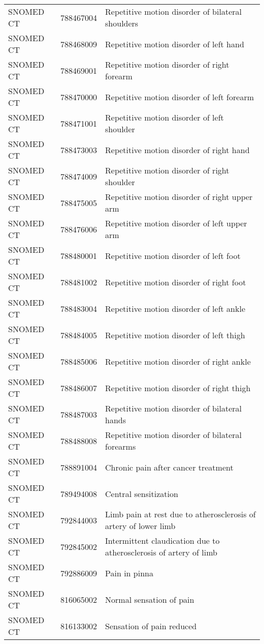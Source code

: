 \begin{longtable}{p{}p{}p{}}
  SNOMED CT & 788467004 & Repetitive motion disorder of bilateral shoulders \\ 
  SNOMED CT & 788468009 & Repetitive motion disorder of left hand \\ 
  SNOMED CT & 788469001 & Repetitive motion disorder of right forearm \\ 
  SNOMED CT & 788470000 & Repetitive motion disorder of left forearm \\ 
  SNOMED CT & 788471001 & Repetitive motion disorder of left shoulder \\ 
  SNOMED CT & 788473003 & Repetitive motion disorder of right hand \\ 
  SNOMED CT & 788474009 & Repetitive motion disorder of right shoulder \\ 
  SNOMED CT & 788475005 & Repetitive motion disorder of right upper arm \\ 
  SNOMED CT & 788476006 & Repetitive motion disorder of left upper arm \\ 
  SNOMED CT & 788480001 & Repetitive motion disorder of left foot \\ 
  SNOMED CT & 788481002 & Repetitive motion disorder of right foot \\ 
  SNOMED CT & 788483004 & Repetitive motion disorder of left ankle \\ 
  SNOMED CT & 788484005 & Repetitive motion disorder of left thigh \\ 
  SNOMED CT & 788485006 & Repetitive motion disorder of right ankle \\ 
  SNOMED CT & 788486007 & Repetitive motion disorder of right thigh \\ 
  SNOMED CT & 788487003 & Repetitive motion disorder of bilateral hands \\ 
  SNOMED CT & 788488008 & Repetitive motion disorder of bilateral forearms \\ 
  SNOMED CT & 788891004 & Chronic pain after cancer treatment \\ 
  SNOMED CT & 789494008 & Central sensitization \\ 
  SNOMED CT & 792844003 & Limb pain at rest due to atherosclerosis of artery of lower limb \\ 
  SNOMED CT & 792845002 & Intermittent claudication due to atherosclerosis of artery of limb \\ 
  SNOMED CT & 792886009 & Pain in pinna \\ 
  SNOMED CT & 816065002 & Normal sensation of pain \\ 
  SNOMED CT & 816133002 & Sensation of pain reduced \\ 

\end{longtable}
